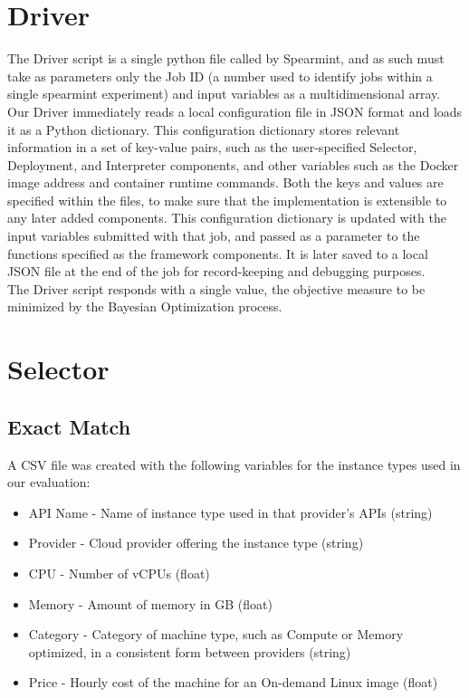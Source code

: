 \documentclass{report}
\begin{document}
\section{Driver}
The Driver script is a single python file called by Spearmint, and as such must take as parameters only the Job ID (a number used to identify jobs within a single spearmint experiment) and input variables as a multidimensional array.\\
Our Driver immediately reads a local configuration file in JSON format and loads it as a Python dictionary. This configuration dictionary stores relevant information in a set of key-value pairs, such as the user-specified Selector, Deployment, and Interpreter components, and other variables such as the Docker image address and container runtime commands. Both the keys and values are specified within the files, to make sure that the implementation is extensible to any later added components. This configuration dictionary is updated with the input variables submitted with that job, and passed as a parameter to the functions specified as the framework components. It is later saved to a local JSON file at the end of the job for record-keeping and debugging purposes. \\
The Driver script responds with a single value, the objective measure to be minimized by the Bayesian Optimization process.
\section{Selector}
\subsection{Exact Match}
A CSV file was created with the following variables for the instance types used in our evaluation:

\begin{itemize}
\item API Name - Name of instance type used in that provider's APIs (string)
\item Provider - Cloud provider offering the instance type (string)
\item CPU - Number of vCPUs (float)
\item Memory - Amount of memory in GB (float)
\item Category - Category of machine type, such as Compute or Memory optimized, in a consistent form between providers (string) 	
\item Price - Hourly cost of the machine for an On-demand Linux image (float)
\end{itemize}
\end{document}
